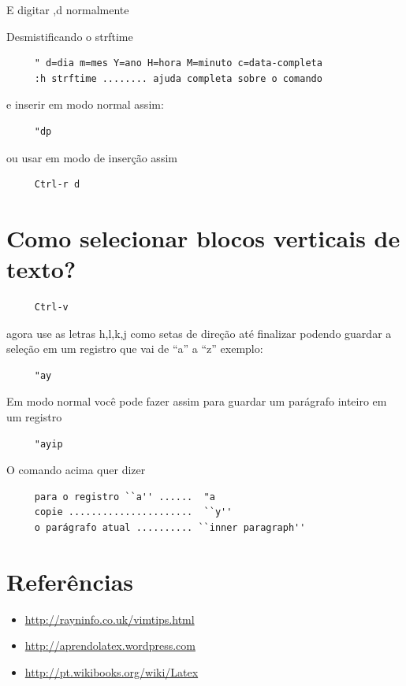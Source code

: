 \documentclass[10pt,a4paper,openany]{book}
\begin{document}
E digitar ,d normalmente

Desmistificando o strftime
\begin{verbatim}
     " d=dia m=mes Y=ano H=hora M=minuto c=data-completa
     :h strftime ........ ajuda completa sobre o comando
\end{verbatim}

e inserir em modo normal assim:

\begin{verbatim}
     "dp
\end{verbatim}

ou usar em modo de inserção assim

\begin{verbatim}
     Ctrl-r d
\end{verbatim}

\section{Como selecionar blocos verticais de texto?}
\label{Como selecionar blocos verticais de texto?}

\begin{verbatim}
     Ctrl-v
\end{verbatim}

agora use as letras h,l,k,j como setas de direção até finalizar
podendo guardar a seleção em um registro que vai de ``a'' a ``z'' exemplo:

\begin{verbatim}
     "ay
\end{verbatim}

Em modo normal você pode fazer assim para guardar um parágrafo inteiro em um registro

\begin{verbatim}
     "ayip
\end{verbatim}

O comando acima quer dizer

\begin{verbatim}
     para o registro ``a'' ......  "a
     copie ......................  ``y''
     o parágrafo atual .......... ``inner paragraph''
\end{verbatim}

\section{Referências}
\label{Referências}

\begin{itemize}
   \item \url{http://rayninfo.co.uk/vimtips.html}
   \item \url{http://aprendolatex.wordpress.com}
   \item \url{http://pt.wikibooks.org/wiki/Latex}
\end{itemize}
\end{document}
